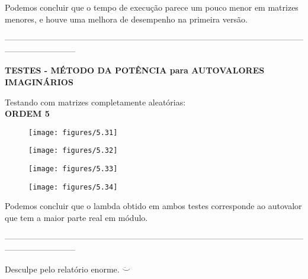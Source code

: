 \documentclass[leqno]{article}
\numberwithin{equation}{section}
\begin{document}
Podemos concluir que o tempo de execução parece um pouco menor em matrizes menores, e houve uma melhora de desempenho na primeira versão.

--------------------------------------------------------------------------------------------------------------------------------------

\textbf{{\large TESTES - MÉTODO DA POTÊNCIA para AUTOVALORES IMAGINÁRIOS}}

	Testando com matrizes completamente aleatórias:\\
	
	\textbf{{\large ORDEM 5}}	
	\begin{figure}[H]
		\centering
		\texttt{[image: figures/5.31]}
	\end{figure}
	\begin{figure}[H]
		\centering
		\texttt{[image: figures/5.32]}
	\end{figure}
	\begin{figure}[H]
		\centering
		\texttt{[image: figures/5.33]}
	\end{figure}
	\begin{figure}[H]
		\centering
		\texttt{[image: figures/5.34]}
	\end{figure}

	Podemos concluir que o lambda obtido em ambos testes corresponde ao autovalor que tem a maior parte real em módulo. 
	
--------------------------------------------------------------------------------------------------------------------------------------

\large{Desculpe pelo relatório enorme. $\ddot\smile$}
\end{document}
